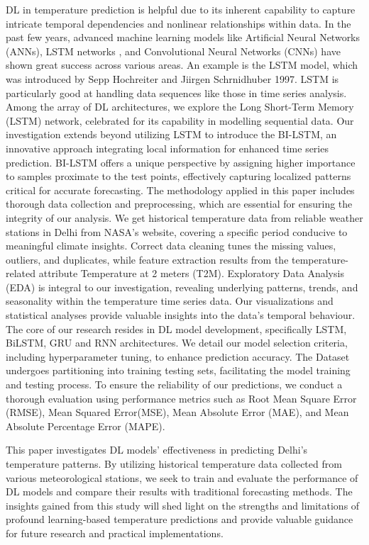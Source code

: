 \documentclass[sn-mathphys,Numbered]{sn-jnl}
\theoremstyle{thmstyleone}
\theoremstyle{thmstyletwo}
\theoremstyle{thmstylethree}
\begin{document}
DL in temperature prediction is helpful due to its inherent capability to capture intricate temporal dependencies and nonlinear relationships within data. In the past few years, advanced machine learning models like Artificial Neural Networks (ANNs), LSTM networks\cite{wang2017predrnn} \cite{chen2021study}, and Convolutional Neural Networks (CNNs)\cite{chen2021correction} have shown great success across various areas. An example is the LSTM model, which was introduced by Sepp Hochreiter and Jiirgen Schrnidhuber\cite{graves2012long} 1997. LSTM is particularly good at handling data sequences like those in time series analysis. Among the array of DL architectures, we explore the Long Short-Term Memory (LSTM) network, celebrated for its capability in modelling sequential data. Our investigation extends beyond utilizing LSTM to introduce the BI-LSTM, an innovative approach integrating local information for enhanced time series prediction.
BI-LSTM offers a unique perspective by assigning higher importance to samples proximate to the test points, effectively capturing localized patterns critical for accurate forecasting. The methodology applied in this paper includes thorough data collection and preprocessing, which are essential for ensuring the integrity of our analysis. We get historical temperature data from reliable weather stations in Delhi from NASA's website, covering a specific period conducive to meaningful climate insights. Correct data cleaning tunes the missing values, outliers, and duplicates, while feature extraction results from the temperature-related attribute Temperature at 2 meters (T2M). Exploratory Data Analysis (EDA) is integral to our investigation, revealing underlying patterns, trends, and seasonality within the temperature time series data. Our visualizations and statistical analyses provide valuable insights into the data's temporal behaviour. The core of our research resides in DL model development, specifically LSTM, BiLSTM, GRU and RNN architectures. We detail our model selection criteria, including hyperparameter tuning, to enhance prediction accuracy. The Dataset undergoes partitioning into training testing sets, facilitating the model training and testing process. To ensure the reliability of our predictions, we conduct a thorough evaluation using performance metrics such as Root Mean Square Error (RMSE), Mean Squared Error(MSE), Mean Absolute Error (MAE), and Mean Absolute Percentage Error (MAPE).


This paper investigates DL models' effectiveness in predicting Delhi's temperature patterns. By utilizing historical temperature data collected from various meteorological stations, we seek to train and evaluate the performance of DL models and compare their results with traditional forecasting methods. The insights gained from this study will shed light on the strengths and limitations of profound learning-based temperature predictions and provide valuable guidance for future research and practical implementations.
\end{document}
